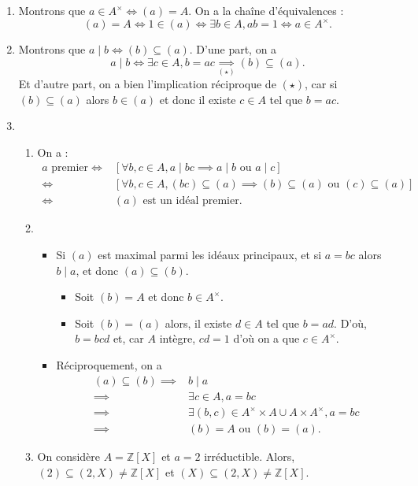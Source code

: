 \documentclass[./main]{subfiles}
\begin{document}
  \begin{enumerate}
    \item Montrons que $a \in A^\times \iff (a) = A$.
      On a la chaîne d'équivalences :
      \[
        (a) = A \iff 1 \in (a) \iff \exists b \in A, ab = 1 \iff a \in A^\times
      .\] 
    \item Montrons que $a  \mid b \iff (b) \subseteq (a)$.
      D'une part, on a \[
        a  \mid b \iff \exists c \in A, b  = a c \underset {(\star)}\implies (b) \subseteq (a)
      .\]
      Et d'autre part, on a bien l'implication réciproque de $(\star)$, car si~$(b) \subseteq (a)$ alors $b \in (a)$ et donc il existe $c \in A$ tel que $b = a c$.
    \item 
      \begin{enumerate}
        \item On a :
          {
          \footnotesize
          \begin{align*}
            a \text{ premier}
            \iff& [\forall b, c \in A, a  \mid b c \implies a \mid b \text{ ou } a \mid c]\\
            \iff& [\forall b, c \in A, (bc) \subseteq (a) \implies (b) \subseteq (a) \text{ ou } (c) \subseteq (a)]\\
            \iff& (a) \text{ est un idéal premier}
          .\end{align*}
          }
        \item 
          \begin{itemize}
            \item Si $(a)$ est maximal parmi les idéaux principaux, et si $a = b c$ alors $b  \mid a$, et donc $(a) \subseteq (b)$.
              \begin{itemize}
                \item Soit $(b) = A$ et donc  $b \in A^\times$.
                \item Soit $(b) = (a)$ alors, il existe $d \in A$ tel que $b = a d$.
                  D'où,  $b = bcd$ et, car  $A$ intègre, $cd = 1$ d'où on a que $c \in A^\times$.
              \end{itemize}
            \item Réciproquement, on a 
              \begin{align*}
                (a) \subseteq (b) \implies& b  \mid a\\
                \implies& \exists c \in A, a = b c\\
                \implies& \exists (b,c) \in A^\times \times A \cup A \times A^\times, a = b c\\
                \implies& (b) = A \text{ ou } (b) = (a)
              .\end{align*}
          \end{itemize}
        \item On considère $A = \mathds{Z}[X]$ et $a = 2$ irréductible.
          Alors, $(2) \subseteq (2, X) \neq \mathds{Z}[X]$ et $(X) \subseteq (2, X) \neq \mathds{Z}[X]$.
      \end{enumerate}
  \end{enumerate}
\end{document}

